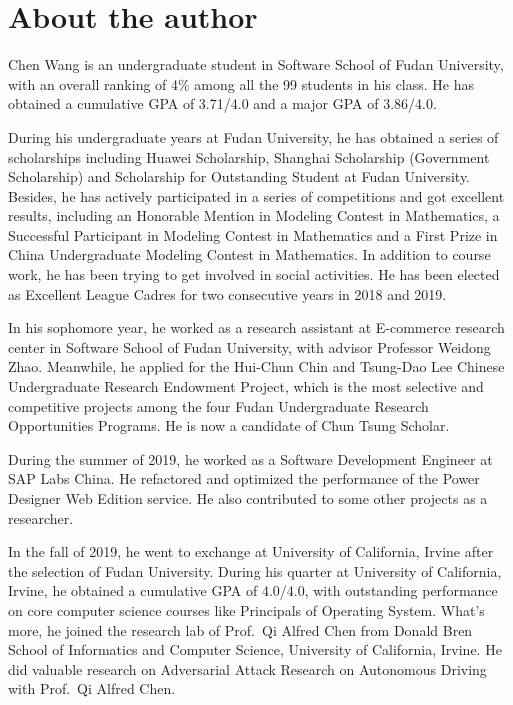 \documentclass[12pt,a4paper]{article}
\begin{document}
\pagebreak

\hypertarget{about-the-author}{%
\section*{About the author}\label{about-the-author}}

Chen Wang is an undergraduate student in Software School of Fudan
University, with an overall ranking of 4\% among all the 99 students in
his class. He has obtained a cumulative GPA of 3.71/4.0 and a major GPA
of 3.86/4.0.

During his undergraduate years at Fudan University, he has obtained a
series of scholarships including Huawei Scholarship, Shanghai
Scholarship (Government Scholarship) and Scholarship for Outstanding
Student at Fudan University. Besides, he has actively participated in a
series of competitions and got excellent results, including an Honorable
Mention in Modeling Contest in Mathematics, a Successful Participant in
Modeling Contest in Mathematics and a First Prize in China Undergraduate
Modeling Contest in Mathematics. In addition to course work, he has been
trying to get involved in social activities. He has been elected as
Excellent League Cadres for two consecutive years in 2018 and 2019.

In his sophomore year, he worked as a research assistant at E-commerce
research center in Software School of Fudan University, with advisor
Professor Weidong Zhao. Meanwhile, he applied for the Hui-Chun Chin and
Tsung-Dao Lee Chinese Undergraduate Research Endowment Project, which is
the most selective and competitive projects among the four Fudan
Undergraduate Research Opportunities Programs. He is now a candidate of
Chun Tsung Scholar.

During the summer of 2019, he worked as a Software Development Engineer
at SAP Labs China. He refactored and optimized the performance of the
Power Designer Web Edition service. He also contributed to some other
projects as a researcher.

In the fall of 2019, he went to exchange at University of California,
Irvine after the selection of Fudan University. During his quarter at
University of California, Irvine, he obtained a cumulative GPA of
4.0/4.0, with outstanding performance on core computer science courses
like Principals of Operating System. What's more, he joined the research
lab of Prof.~Qi Alfred Chen from Donald Bren School of Informatics and
Computer Science, University of California, Irvine. He did valuable
research on Adversarial Attack Research on Autonomous Driving with
Prof.~Qi Alfred Chen.
\end{document}
